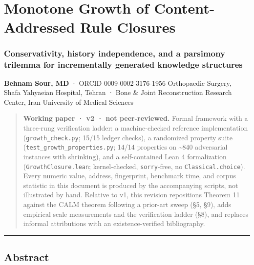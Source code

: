 \documentclass[
  10pt,
]{article}
\author{}
\date{}
\begin{document}
\hypertarget{monotone-growth-of-content-addressed-rule-closures}{%
\section{Monotone Growth of Content-Addressed Rule
Closures}\label{monotone-growth-of-content-addressed-rule-closures}}

\hypertarget{conservativity-history-independence-and-a-parsimony-trilemma-for-incrementally-generated-knowledge-structures}{%
\subsubsection{Conservativity, history independence, and a parsimony
trilemma for incrementally generated knowledge
structures}\label{conservativity-history-independence-and-a-parsimony-trilemma-for-incrementally-generated-knowledge-structures}}

\textbf{Behnam Sour, MD} · ORCID 0009-0002-3176-1956 Orthopaedic
Surgery, Shafa Yahyaeian Hospital, Tehran · Bone \& Joint Reconstruction
Research Center, Iran University of Medical Sciences

\begin{quote}
\textbf{Working paper · v2 · not peer-reviewed.} Formal framework with a
three-rung verification ladder: a machine-checked reference
implementation (\texttt{growth\_check.py}; 15/15 ledger checks), a
randomized property suite (\texttt{test\_growth\_properties.py}; 14/14
properties on \textasciitilde840 adversarial instances with shrinking),
and a self-contained Lean 4 formalization (\texttt{GrowthClosure.lean};
kernel-checked, \texttt{sorry}-free, no \texttt{Classical.choice}).
Every numeric value, address, fingerprint, benchmark time, and corpus
statistic in this document is produced by the accompanying scripts, not
illustrated by hand. Relative to v1, this revision repositions Theorem
11 against the CALM theorem following a prior-art sweep (§5, §9), adds
empirical scale measurements and the verification ladder (§8), and
replaces informal attributions with an existence-verified bibliography.
\end{quote}

\begin{center}\rule{0.5\linewidth}{0.5pt}\end{center}

\hypertarget{abstract}{%
\subsection{Abstract}\label{abstract}}
\end{document}
